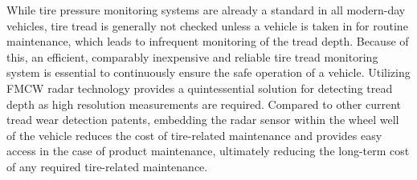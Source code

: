 \documentclass[11pt]{article}
\begin{document}
	While tire pressure monitoring systems are already a standard in all modern-day vehicles, tire tread is generally not checked unless a vehicle is taken in for routine maintenance, which leads to infrequent monitoring of the tread depth. Because of this, an efficient, comparably inexpensive and reliable tire tread monitoring system is essential to continuously ensure the safe operation of a vehicle. Utilizing FMCW radar technology provides a quintessential solution for detecting tread depth as high resolution measurements are required. Compared to other current tread wear detection patents, embedding the radar sensor within the wheel well of the vehicle reduces the cost of tire-related maintenance and provides easy access in the case of product maintenance, ultimately reducing the long-term cost of any required tire-related maintenance.
\end{document}

